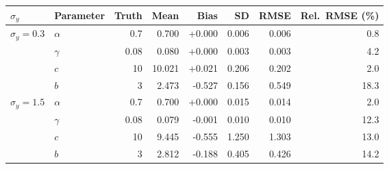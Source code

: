\begin{tabular}{llrrrrrr}
\toprule
$\sigma_y$ & Parameter & Truth & Mean & Bias & SD & RMSE & Rel.\ RMSE (\%)\\
\midrule
$\sigma_y=0.3$ & $\alpha$ & 0.7 & 0.700 & +0.000 & 0.006 & 0.006 & 0.8\\
 & $\gamma$ & 0.08 & 0.080 & +0.000 & 0.003 & 0.003 & 4.2\\
 & $c$ & 10 & 10.021 & +0.021 & 0.206 & 0.202 & 2.0\\
 & $b$ & 3 & 2.473 & -0.527 & 0.156 & 0.549 & 18.3\\
\midrule
$\sigma_y=1.5$ & $\alpha$ & 0.7 & 0.700 & +0.000 & 0.015 & 0.014 & 2.0\\
 & $\gamma$ & 0.08 & 0.079 & -0.001 & 0.010 & 0.010 & 12.3\\
 & $c$ & 10 & 9.445 & -0.555 & 1.250 & 1.303 & 13.0\\
 & $b$ & 3 & 2.812 & -0.188 & 0.405 & 0.426 & 14.2\\
\bottomrule
\end{tabular}
